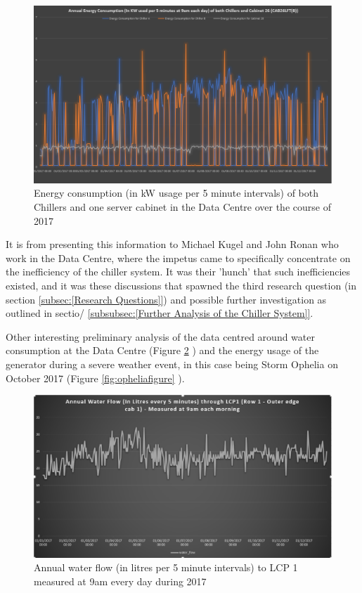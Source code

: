 \documentclass[12pt]{scrartcl}
\begin{document}
\begin{figure}[h]
  \caption{Energy consumption (in kW usage per 5 minute intervals) of both Chillers and one server cabinet in the Data Centre over the course of 2017}
  \label{fig:cabvchillerfigure}
  \centering
    \includegraphics[scale=0.45]{Energy_consumption_of_cab26_and_chillers.png}
\end{figure} 

It is from presenting this information to Michael Kugel and John Ronan who work in the Data Centre, where the impetus came to specifically concentrate on the inefficiency of the chiller system. It was their 'hunch' that such inefficiencies existed, and it was these discussions that spawned the third research question (in section \ref{subsec:[Research Questions]}) and possible further investigation as outlined in sectio/ \ref{subsubsec:[Further Analysis of the Chiller System]}.   

Other interesting preliminary analysis of the data centred around water consumption at the Data Centre (Figure \ref{fig:annualwaterfigure} ) and the energy usage of the generator during a severe weather event, in this case being Storm Ophelia on October 2017 (Figure \ref{fig:opheliafigure} ). 

\begin{figure}[h]
  \caption{Annual water flow (in litres per 5 minute intervals) to LCP 1 measured at 9am every day during 2017}
  \label{fig:annualwaterfigure}
  \centering
    \includegraphics[scale=0.45]{Annual_Water_Flow.png}
\end{figure} 
\end{document}
